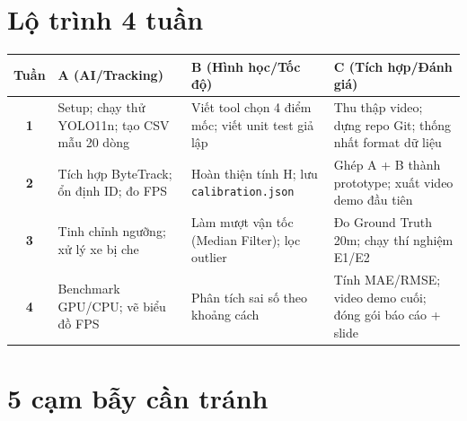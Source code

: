 \documentclass[11pt,a4paper]{article}
\begin{document}
\section{Lộ trình 4 tuần}

\begin{table}[H]
\centering\small
\begin{tabularx}{\textwidth}{@{}c Y Y Y@{}}
\toprule
\textbf{Tuần} & \textbf{A (AI/Tracking)} & \textbf{B (Hình học/Tốc độ)} & \textbf{C (Tích hợp/Đánh giá)}\\
\midrule
\textbf{1} & Setup; chạy thử YOLO11n; tạo CSV mẫu 20 dòng & Viết tool chọn 4 điểm mốc; viết unit test giả lập & Thu thập video; dựng repo Git; thống nhất format dữ liệu\\
\midrule
\textbf{2} & Tích hợp ByteTrack; ổn định ID; đo FPS & Hoàn thiện tính H; lưu \texttt{calibration.json} & Ghép A + B thành prototype; xuất video demo đầu tiên\\
\midrule
\textbf{3} & Tinh chỉnh ngưỡng; xử lý xe bị che & Làm mượt vận tốc (Median Filter); lọc outlier & Đo Ground Truth 20m; chạy thí nghiệm E1/E2\\
\midrule
\textbf{4} & Benchmark GPU/CPU; vẽ biểu đồ FPS & Phân tích sai số theo khoảng cách & Tính MAE/RMSE; video demo cuối; đóng gói báo cáo + slide\\
\bottomrule
\end{tabularx}
\end{table}

\section{5 cạm bẫy cần tránh}
\end{document}

